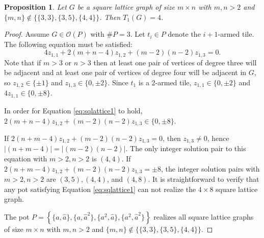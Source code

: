 \documentclass{elsarticle}
\newtheorem{proposition}[theorem]{Proposition}
\theoremstyle{definition}
\theoremstyle{remark}
\theoremstyle{plain}
\theoremstyle{plain}
\begin{document}
\begin{proposition}\label{props1mostlattices} Let $G$ be a square lattice graph of size $m \times n$ with $m,n >2$ and $\{m,n\} \not \in \{\{3,3\}, \{3,5\}, \{4,4\}\}$. Then $T_1(G)=4$. \end{proposition} 
\begin{proof} 
 Assume $G \in \mathcal{O}(P)$ with $\#P = 3$. Let $t_i \in P$ denote the $i+1$-armed tile. The following equation must be satisfied:
\begin{equation} \label{eq:sqlattice1} 4z_{1,1}+2(m+n-4)z_{1,2}+(m-2)(n-2)z_{1,3} = 0. \end{equation}
Note that if $m>3$ or $n>3$ then at least one pair of  vertices of degree three will be adjacent and at least one pair of vertices of degree four will be adjacent in $G$, so $z_{1,2} \in \{\pm 1\}$  and $z_{1,3} \in \{0,\pm 2\}$. Since $t_1$ is a  2-armed tile, $z_{1,1} \in \{0,\pm 2\}$ and $4z_{1,1} \in \{0,\pm 8\}$.\par
In order for Equation \ref{eq:sqlattice1} to hold, $2(m+n-4)z_{1,2}+(m-2)(n-2)z_{1,3} \in \{0, \pm 8\}$. \par
If $2(n+m-4)z_{1,2}+(m-2)(n-2)z_{1,3} = 0$, then $z_{1,3} \neq 0$, hence $|(n+m-4)|=|(m-2)(n-2)|$. The only integer solution pair to this equation with $m>2, n>2$ is $(4,4)$. If $2(n+m-4)z_{1,2}+(m-2)(n-2)z_{1,3} = \pm 8$, the integer solution pairs with $m>2, n>2$ are $(3,5),(4,4)$, and $(4,8)$.  It is straightforward to verify that any pot satisfying Equation \ref{eq:sqlattice1} can not realize the $4 \times 8$ square lattice graph. \par
The pot $P = \left\{\{a,\hat{a}\},\{a,\hat{a}^2\},\{a^2,\hat{a}\},\{a^2,\hat{a}^2\}\right\}$ realizes all square lattice graphs of size $m \times n$ with $m, n > 2$ and $\{m,n\} \not \in \{\{3,3\}, \{3,5\}, \{4,4\}\}$.
\end{proof} 
\end{document}
